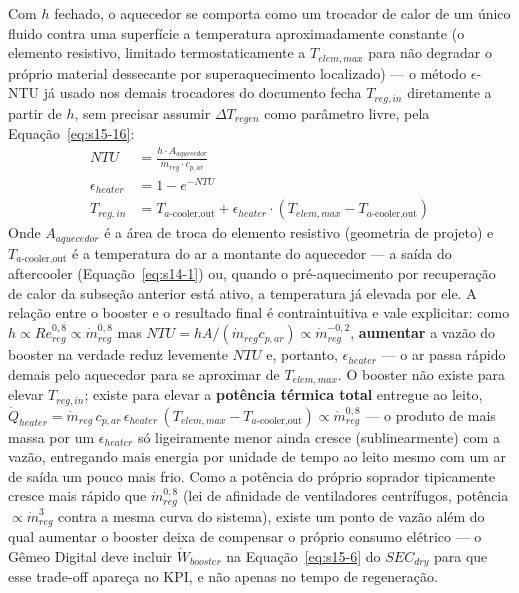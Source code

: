 \documentclass[12pt,a4paper]{article}
\numberwithin{equation}{section}
\numberwithin{table}{section}
\numberwithin{figure}{section}
\begin{document}
{		Com $h$ fechado, o aquecedor se comporta como um trocador de calor de um único fluido contra uma superfície a temperatura aproximadamente constante (o elemento resistivo, limitado termostaticamente a $T_{elem,max}$ para não degradar o próprio material dessecante por superaquecimento localizado) — o método $\epsilon$-NTU já usado nos demais trocadores do documento fecha $T_{reg,in}$ diretamente a partir de $h$, sem precisar assumir $\Delta T_{regen}$ como parâmetro livre, pela Equação~\eqref{eq:s15-16}:
		\begin{equation}\label{eq:s15-16}
		\begin{aligned}
			NTU &= \frac{h \cdot A_{aquecedor}}{\dot{m}_{reg} \cdot c_{p,ar}} \\[4pt]
			\epsilon_{heater} &= 1 - e^{-NTU} \\[4pt]
			T_{reg,in} &= T_{a\text{-cooler,out}} + \epsilon_{heater} \cdot \left( T_{elem,max} - T_{a\text{-cooler,out}} \right)
		\end{aligned}
	\end{equation}
		Onde $A_{aquecedor}$ é a área de troca do elemento resistivo (geometria de projeto) e $T_{a\text{-cooler,out}}$ é a temperatura do ar a montante do aquecedor — a saída do aftercooler (Equação~\eqref{eq:s14-1}) ou, quando o pré-aquecimento por recuperação de calor da subseção anterior está ativo, a temperatura já elevada por ele. A relação entre o booster e o resultado final é contraintuitiva e vale explicitar: como $h \propto Re_{reg}^{0{,}8} \propto \dot{m}_{reg}^{0{,}8}$ mas $NTU = hA/(\dot{m}_{reg}c_{p,ar}) \propto \dot{m}_{reg}^{-0{,}2}$, \textbf{aumentar} a vazão do booster na verdade reduz levemente $NTU$ e, portanto, $\epsilon_{heater}$ — o ar passa rápido demais pelo aquecedor para se aproximar de $T_{elem,max}$. O booster não existe para elevar $T_{reg,in}$; existe para elevar a \textbf{potência térmica total} entregue ao leito, $\dot{Q}_{heater} = \dot{m}_{reg} \, c_{p,ar} \, \epsilon_{heater} \, (T_{elem,max} - T_{a\text{-cooler,out}}) \propto \dot{m}_{reg}^{0{,}8}$ — o produto de mais massa por um $\epsilon_{heater}$ só ligeiramente menor ainda cresce (sublinearmente) com a vazão, entregando mais energia por unidade de tempo ao leito mesmo com um ar de saída um pouco mais frio. Como a potência do próprio soprador tipicamente cresce mais rápido que $\dot{m}_{reg}^{0{,}8}$ (lei de afinidade de ventiladores centrífugos, potência $\propto \dot{m}_{reg}^{3}$ contra a mesma curva do sistema), existe um ponto de vazão além do qual aumentar o booster deixa de compensar o próprio consumo elétrico — o Gêmeo Digital deve incluir $\dot{W}_{booster}$ na Equação~\eqref{eq:s15-6} do $SEC_{dry}$ para que esse trade-off apareça no KPI, e não apenas no tempo de regeneração.

}
\end{document}
